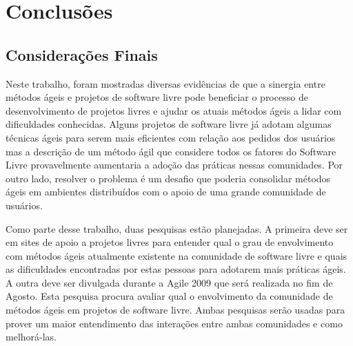 \chapter{Conclusões}
\label{cap:conclusoes}

\section{Considerações Finais}

Neste trabalho, foram mostradas diversas evidências de que a sinergia
entre métodos ágeis e projetos de software livre pode beneficiar o
processo de desenvolvimento de projetos livres e ajudar os atuais
métodos ágeis a lidar com dificuldades conhecidas. Alguns projetos de
software livre já adotam algumas técnicas ágeis para serem mais
eficientes com relação aos pedidos dos usuários mas a descrição de um
método ágil que considere todos os fatores do Software Livre
provavelmente aumentaria a adoção das práticas nessas comunidades. Por
outro lado, resolver o problema é um desafio que poderia consolidar
métodos ágeis em ambientes distribuídos com o apoio de uma grande
comunidade de usuários.

Como parte desse trabalho, duas pesquisas estão planejadas. A primeira
deve ser em sites de apoio a projetos livres para entender qual o grau
de envolvimento com métodos ágeis atualmente existente na comunidade
de software livre e quais as dificuldades encontradas por estas
pessoas para adotarem mais práticas ágeis. A outra deve ser divulgada
durante a Agile 2009 que será realizada no fim de Agosto. Esta
pesquisa procura avaliar qual o envolvimento da comunidade de métodos
ágeis em projetos de software livre. Ambas pesquisas serão usadas para
prover um maior entendimento das interações entre ambas comunidades e
como melhorá-las.


